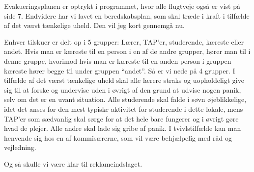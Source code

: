 \documentclass[a4paper,11pt]{article}
\begin{document}
\begin{sketch}
Evakueringsplanen er optrykt i programmet, hvor alle flugtveje også er vist på
side 7. Endvidere har vi lavet en beredskabsplan, som skal træde i kraft i
tilfælde af det værst tænkelige uheld. Den vil jeg kort gennemgå nu.

Enhver tilskuer er delt op i 5 grupper: Lærer, TAP'er, studerende, kæreste eller
andet.  Hvis man er kæreste til en person i en af de andre grupper, hører man
til i denne gruppe, hvorimod hvis man er kæreste til en anden person i gruppen
kæreste hører begge til under gruppen ``andet''. Så er vi nede på 4 grupper. I
tilfælde af det værst tænkelige uheld skal alle lærere straks og uopholdeligt
give sig til at forske og undervise uden i øvrigt af den grund at udvise nogen
panik, selv om det er en uvant situation. Alle studerende skal falde i søvn
øjeblikkelige, idet det anses for den mest typiske aktivitet for studerende i
dette lokale, mens TAP'er som sædvanlig skal sørge for at det hele bare fungerer
og i øvrigt gøre hvad de plejer. Alle andre skal lade sig gribe af panik. I
tvivlstilfælde kan man henvende sig hos en af kommisærerne, som vil være
behjælpelig med råd og vejledning.

Og så skulle vi være klar til reklameindslaget.

\end{sketch}
\end{document}
